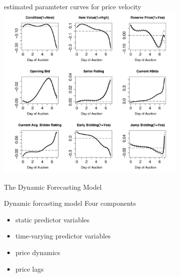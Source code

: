 \documentclass[hyperref={pdfpagelabels=false}]{beamer}
\begin{document}
\begin{frame}{estimated paramteter curves for price velocity}
\center
\includegraphics[width=0.7\textwidth]{price_velocity} %
\end{frame} %

\begin{frame}
\centering
The Dynamic Forecasting Model
\end{frame}

\begin{frame}{Dynamic forcasting model}
Four components
\begin{itemize}
	\item static predictor variables
	\item time-varying predictor variables
	\item price dynamics
	\item price lags
\end{itemize}	
\end{frame}
\end{document}
